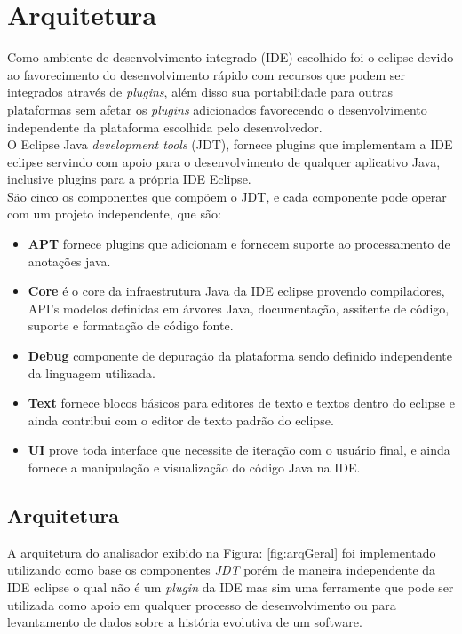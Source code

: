 \chapter {Arquitetura}

Como ambiente de desenvolvimento integrado (IDE) escolhido foi o eclipse devido ao favorecimento do desenvolvimento rápido com recursos que podem ser integrados através de {\it plugins}, além disso sua portabilidade para outras plataformas sem afetar os {\it plugins} adicionados favorecendo o desenvolvimento independente da plataforma escolhida pelo desenvolvedor.\\

O Eclipse Java {\it development tools} (JDT), fornece plugins que implementam a IDE eclipse servindo com apoio para o desenvolvimento de qualquer aplicativo Java, inclusive plugins para a própria IDE Eclipse.\\

São cinco os componentes que compõem o JDT, e cada componente pode operar com um projeto independente, que são:

	\begin{itemize}
		\item \textbf{APT} fornece plugins que adicionam e fornecem suporte ao processamento de anotações java.
		\item \textbf{Core} é o core da infraestrutura Java da IDE eclipse provendo compiladores, API's modelos definidas em árvores Java, documentação, assitente de código, suporte e formatação de código fonte.
		\item \textbf{Debug} componente de depuração da plataforma sendo definido independente da linguagem utilizada.
		\item \textbf{Text} fornece blocos básicos para editores de texto e textos dentro do eclipse e ainda contribui com o editor de texto padrão do eclipse. \item \textbf{UI} prove toda interface que necessite de iteração com o usuário final, e ainda fornece a manipulação e visualização do código Java na IDE.
	\end{itemize} 
	

\clearpage
	
\section {Arquitetura}

A arquitetura do analisador exibido na Figura: \ref{fig:arqGeral} foi  implementado utilizando como base os componentes \textit{JDT} porém de maneira independente da IDE eclipse o qual não é um {\it plugin} da IDE mas sim uma ferramente que pode ser utilizada como apoio em qualquer processo de desenvolvimento ou para levantamento de dados sobre a história evolutiva de um software.\\

